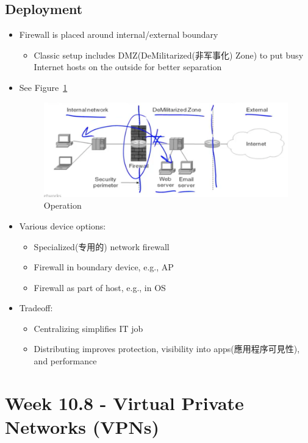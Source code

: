 \documentclass[12pt]{ctexart}   %
\begin{document}
	\subsection{Deployment}
	\begin{itemize}
		\item Firewall is placed around internal/external boundary
		\begin{itemize}
			\item Classic setup includes DMZ(DeMilitarized(非军事化) Zone) to put busy Internet hosts on the outside for better separation
		\end{itemize}
		\item See Figure~\ref{fig:10-7-6}
		  
		\begin{figure}[h!] %
		\centering
		\includegraphics[scale=0.7]{images/10-7-6}
		\caption{Operation}
		\label{fig:10-7-6}
		\end{figure}

		\item Various device options:
		\begin{itemize}
			\item Specialized(专用的) network firewall
			\item Firewall in boundary device, e.g., AP
			\item Firewall as part of host, e.g., in OS
		\end{itemize}

		\item Tradeoff:
		\begin{itemize}
			\item Centralizing simplifies IT job
			\item Distributing improves protection, visibility into apps(應用程序可見性), and performance
		\end{itemize}
	\end{itemize}

\section{Week 10.8 - Virtual Private Networks (VPNs)}
\end{document}
